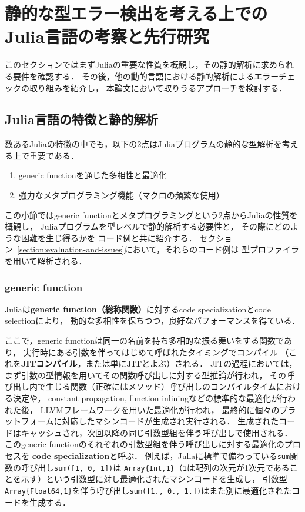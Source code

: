 
\section{静的な型エラー検出を考える上でのJulia言語の考察と先行研究}

このセクションではまずJuliaの重要な性質を概観し，その静的解析に求められる要件を確認する．
その後，他の動的言語における静的解析によるエラーチェックの取り組みを紹介し，
本論文において取りうるアプローチを検討する．


\subsection{Julia言語の特徴と静的解析}

数あるJuliaの特徴の中でも，以下の2点はJuliaプログラムの静的な型解析を考える上で重要である．

\begin{enumerate}
  \item generic functionを通じた多相性と最適化
  \item 強力なメタプログラミング機能（マクロの頻繁な使用）
\end{enumerate}

この小節ではgeneric functionとメタプログラミングという2点からJuliaの性質を概観し，
Juliaプログラムを型レベルで静的解析する必要性と，
その際にどのような困難を生じ得るかを
コード例と共に紹介する．
セクション~\ref{section:evaluation-and-issues}において，それらのコード例は
型プロファイラを用いて解析される．

\subsubsection{generic function} \label{subsubsection: generic-function}

Juliaは\textbf{generic function（総称関数）}に対するcode specializationとcode selectionにより，
動的な多相性を保ちつつ，良好なパフォーマンスを得ている\cite{jeff-phd}．

ここで，generic functionは同一の名前を持ち多相的な振る舞いをする関数であり，
実行時にある引数を伴ってはじめて呼ばれたタイミングでコンパイル
（これを\textbf{JITコンパイル}，または単に\textbf{JIT}とよぶ）される．
JITの過程においては，まず引数の型情報を用いてその関数呼び出しに対する型推論が行われ，
その呼び出し内で生じる関数（正確にはメソッド）呼び出しのコンパイルタイムにおける決定や，
constant propagation, function inliningなどの標準的な最適化が行われた後，
LLVMフレームワーク\cite{LLVM}を用いた最適化が行われ，
最終的に個々のプラットフォームに対応したマシンコードが生成され実行される．
生成されたコードはキャッシュされ，次回以降の同じ引数型組を伴う呼び出しで使用される．
このgeneric functionのそれぞれの引数型組を伴う呼び出しに対する最適化のプロセスを
\textbf{code specialization}と呼ぶ．
例えば，Juliaに標準で備わっている\verb|sum|関数の呼び出し\verb|sum([1, 0, 1])|は
\verb|Array{Int,1}|（\verb|1|は配列の次元が1次元であることを示す）という引数型に対し最適化されたマシンコードを生成し，
引数型\verb|Array{Float64,1}|を伴う呼び出し\verb|sum([1., 0., 1.])|はまた別に最適化されたコードを生成する．

